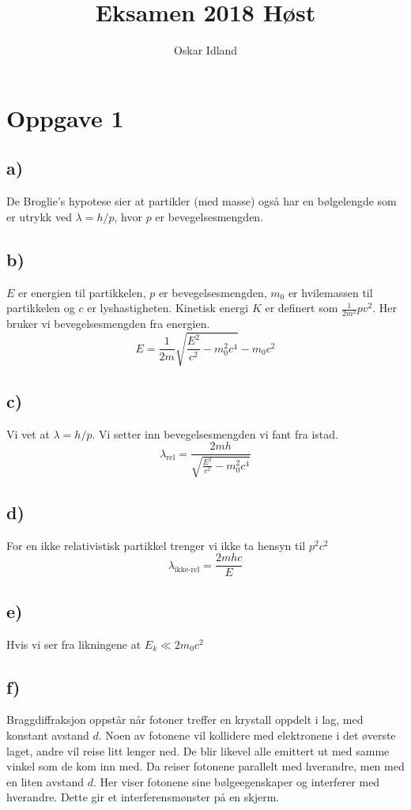 \documentclass{article}
\author{Oskar Idland}
\title{Eksamen 2018 Høst}
\date{}
\begin{document}
\maketitle
\newpage

\section*{Oppgave 1}
  \subsection*{a)}
    De Broglie's hypotese sier at partikler (med masse) også har en bølgelengde som er utrykk ved $λ = h / p$, hvor $p$ er bevegelsesmengden. 
  
  \subsection*{b)}
    $E$ er energien til partikkelen, $p$ er bevegelsesmengden, $m_0$ er hvilemassen til partikkelen og $c$ er lyshastigheten. Kinetisk energi $K$ er definert som $\frac{1}{2m^2}pv^2$. Her bruker vi bevegelsesmengden fra energien. 
    \[
    E = \frac{1}{2m} \sqrt{\frac{E^2}{c^2} - m_0^{2}c^4} - m_0c^2
    \]
    
  \subsection*{c)}
    Vi vet at $λ = h / p$. Vi setter inn bevegelsesmengden vi fant fra istad. 
    \[
    λ_{\text{rel}} = \frac{2mh}{\sqrt{\frac{E^2}{c^2} - m_0^{2}c^4}}
    \]
    
  \subsection*{d)}
    For en ikke relativistisk partikkel trenger vi ikke ta hensyn til $p^2c^2$
    \[
    λ_{\text{ikke-rel}} = \frac{2mhc}{E}
    \]
      
  \subsection*{e)}
    Hvis vi ser fra likningene at $E_k ≪ 2m_0c^2$ 
    
  \subsection*{f)}
    Braggdiffraksjon oppstår når fotoner treffer en krystall oppdelt i lag, med konstant avstand $d$. Noen av fotonene vil kollidere med elektronene i det øverste laget, andre vil reise litt lenger ned. De blir likevel alle emittert ut med samme vinkel som de kom inn med. Da reiser fotonene parallelt med hverandre, men med en liten avstand $d$. Her viser fotonene sine bølgeegenskaper og interferer med hverandre. Dette gir et interferensmønster på en skjerm.
    
\end{document}
